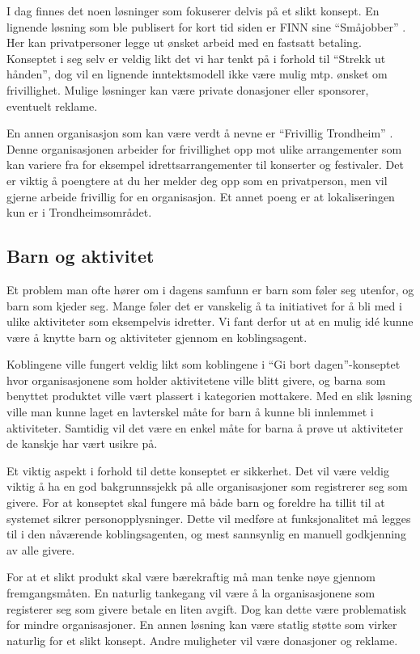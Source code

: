 I dag finnes det noen løsninger som fokuserer delvis på et slikt konsept. En lignende løsning som ble publisert for kort tid siden er FINN sine ``Småjobber'' \citep{website:frivillig_th}. Her kan privatpersoner legge ut ønsket arbeid med en fastsatt betaling. Konseptet i seg selv er veldig likt det vi har tenkt på i forhold til ``Strekk ut hånden'', dog vil en lignende inntektsmodell ikke være mulig mtp. ønsket om frivillighet. Mulige løsninger kan være private donasjoner eller sponsorer, eventuelt reklame.

En annen organisasjon som kan være verdt å nevne er ``Frivillig Trondheim'' \citep{website:Finn}. Denne organisasjonen arbeider for frivillighet opp mot ulike arrangementer som kan variere fra for eksempel idrettsarrangementer til konserter og festivaler. Det er viktig å poengtere at du her melder deg opp som en privatperson, men vil gjerne arbeide frivillig for en organisasjon. Et annet poeng er at lokaliseringen kun er i Trondheimsområdet.

\subsection{Barn og aktivitet}
\label{sec:barnaktivitet}
Et problem man ofte hører om i dagens samfunn er barn som føler seg utenfor, og barn som kjeder seg. Mange føler det er vanskelig å ta initiativet for å bli med i ulike aktiviteter som eksempelvis idretter. Vi fant derfor ut at en mulig idé kunne være å knytte barn og aktiviteter gjennom en koblingsagent.

Koblingene ville fungert veldig likt som koblingene i ``Gi bort dagen''-konseptet hvor organisasjonene som holder aktivitetene ville blitt givere, og barna som benyttet produktet ville vært plassert i kategorien mottakere. Med en slik løsning ville man kunne laget en lavterskel måte for barn å kunne bli innlemmet i aktiviteter. Samtidig vil det være en enkel måte for barna å prøve ut aktiviteter de kanskje har vært usikre på.

Et viktig aspekt i forhold til dette konseptet er sikkerhet. Det vil være veldig viktig å ha en god bakgrunnssjekk på alle organisasjoner som registrerer seg som givere. For at konseptet skal fungere må både barn og foreldre ha tillit til at systemet sikrer personopplysninger. Dette vil medføre at funksjonalitet må legges til i den nåværende koblingsagenten, og mest sannsynlig en manuell godkjenning av alle givere.

For at et slikt produkt skal være bærekraftig må man tenke nøye gjennom fremgangsmåten. En naturlig tankegang vil være å la organisasjonene som registerer seg som givere betale en liten avgift. Dog kan dette være problematisk for mindre organisasjoner. En annen løsning kan være statlig støtte som virker naturlig for et slikt konsept. Andre muligheter vil være donasjoner og reklame.

